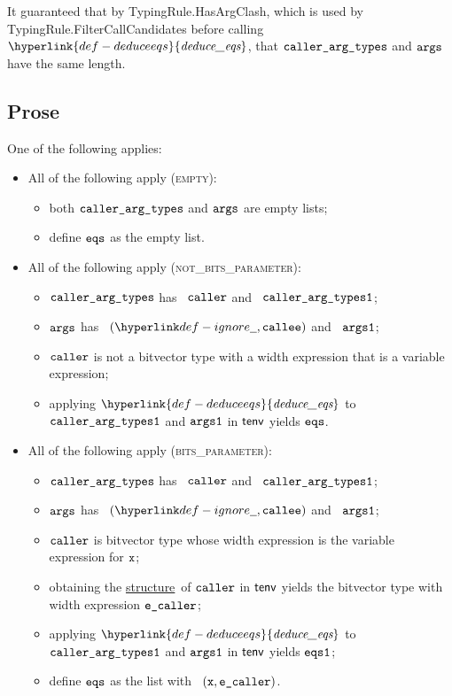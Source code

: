 \documentclass{book}
\newcommand\ProseOrTypeError[0]{\ProseTerminateAs{\TypeErrorConfig}}
\newcommand\structure[0]{\hyperlink{def-structure}{structure}}
\newcommand\deduceeqs[0]{\hyperlink{def-deduceeqs}{\textfunc{deduce\_eqs}}}
\begin{document}
It guaranteed that by TypingRule.HasArgClash,
which is used by \\ TypingRule.FilterCallCandidates before calling $\deduceeqs$,
that $\texttt{caller\_arg\_types}$ and $\texttt{args}$ have the same length.

\subsection{Prose}
One of the following applies:
\begin{itemize}
  \item All of the following apply (\textsc{empty}):
  \begin{itemize}
    \item both $\texttt{caller\_arg\_types}$ and $\texttt{args}$ are empty lists;
    \item define $\texttt{eqs}$ as the empty list.
  \end{itemize}

  \item All of the following apply (\textsc{not\_bits\_parameter}):
  \begin{itemize}
    \item $\texttt{caller\_arg\_types}$ has \head\ $\texttt{caller}$ and \tail\ $\texttt{caller\_arg\_types1}$;
    \item $\texttt{args}$ has \head\ $(\Ignore, \callee)$ and \tail\ $\texttt{args1}$;
    \item $\texttt{caller}$ is not a bitvector type with a width expression that is a variable expression;
    \item applying $\deduceeqs$ to $\texttt{caller\_arg\_types1}$ and $\texttt{args1}$ in $\textsf{tenv}$ yields $\texttt{eqs}$.
  \end{itemize}

  \item All of the following apply (\textsc{bits\_parameter}):
  \begin{itemize}
    \item $\texttt{caller\_arg\_types}$ has \head\ $\texttt{caller}$ and \tail\ $\texttt{caller\_arg\_types1}$;
    \item $\texttt{args}$ has \head\ $(\Ignore, \callee)$ and \tail\ $\texttt{args1}$;
    \item $\texttt{caller}$ is bitvector type whose width expression is the variable expression for $\texttt{x}$;
    \item obtaining the \structure\ of $\texttt{caller}$ in $\textsf{tenv}$ yields the bitvector type with width expression $\texttt{e\_caller}$\ProseOrTypeError;
    \item applying $\deduceeqs$ to $\texttt{caller\_arg\_types1}$ and $\texttt{args1}$ in $\textsf{tenv}$ yields $\texttt{eqs1}$;
    \item define $\texttt{eqs}$ as the list with \head\ $(\texttt{x}, \texttt{e\_caller})$.
  \end{itemize}
\end{itemize}
\end{document}
